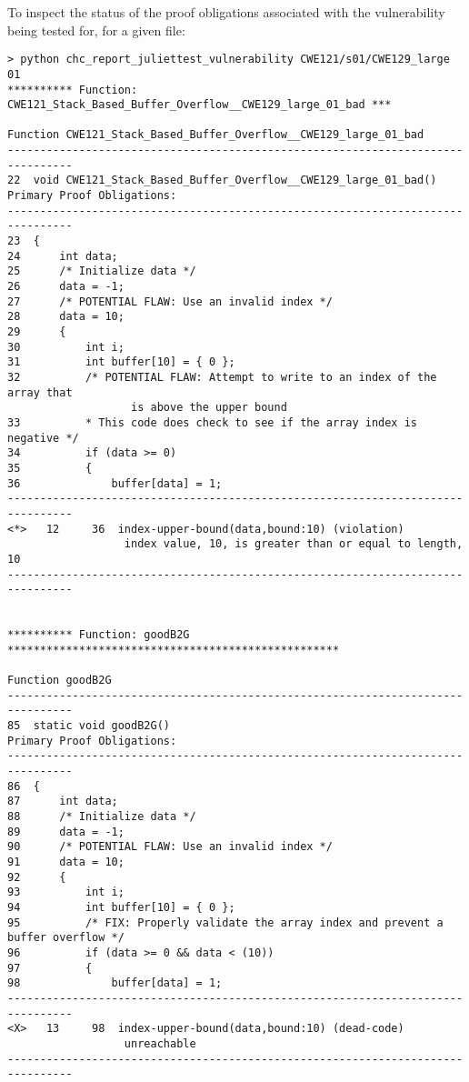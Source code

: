 \documentclass[11pt]{article}
\begin{document}
To inspect the status of the proof obligations associated with the vulnerability being
tested for, for a given file:
\begin{scriptsize}
\begin{verbatim}
> python chc_report_juliettest_vulnerability CWE121/s01/CWE129_large 01
********** Function: CWE121_Stack_Based_Buffer_Overflow__CWE129_large_01_bad ***

Function CWE121_Stack_Based_Buffer_Overflow__CWE129_large_01_bad
--------------------------------------------------------------------------------
22  void CWE121_Stack_Based_Buffer_Overflow__CWE129_large_01_bad()
Primary Proof Obligations:
--------------------------------------------------------------------------------
23  {
24      int data;
25      /* Initialize data */
26      data = -1;
27      /* POTENTIAL FLAW: Use an invalid index */
28      data = 10;
29      {
30          int i;
31          int buffer[10] = { 0 };
32          /* POTENTIAL FLAW: Attempt to write to an index of the array that 
                   is above the upper bound
33          * This code does check to see if the array index is negative */
34          if (data >= 0)
35          {
36              buffer[data] = 1;
--------------------------------------------------------------------------------
<*>   12     36  index-upper-bound(data,bound:10) (violation)
                  index value, 10, is greater than or equal to length, 10
--------------------------------------------------------------------------------


********** Function: goodB2G ***************************************************

Function goodB2G
--------------------------------------------------------------------------------
85  static void goodB2G()
Primary Proof Obligations:
--------------------------------------------------------------------------------
86  {
87      int data;
88      /* Initialize data */
89      data = -1;
90      /* POTENTIAL FLAW: Use an invalid index */
91      data = 10;
92      {
93          int i;
94          int buffer[10] = { 0 };
95          /* FIX: Properly validate the array index and prevent a buffer overflow */
96          if (data >= 0 && data < (10))
97          {
98              buffer[data] = 1;
--------------------------------------------------------------------------------
<X>   13     98  index-upper-bound(data,bound:10) (dead-code)
                  unreachable
--------------------------------------------------------------------------------



\end{verbatim}
\end{scriptsize}
\end{document}
